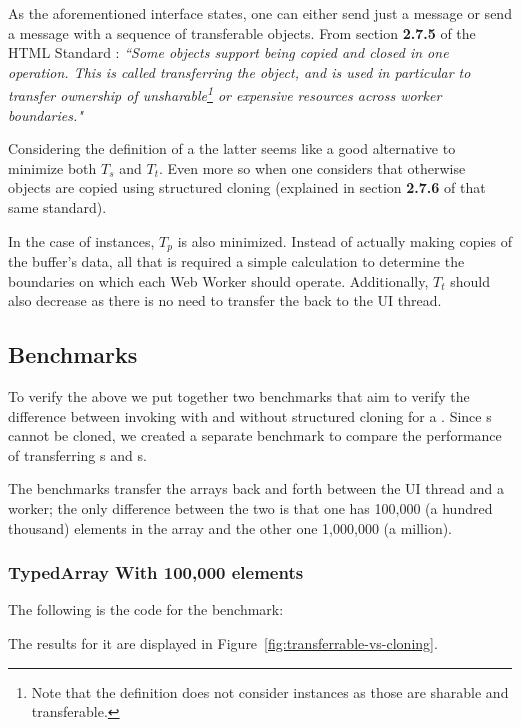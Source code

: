 As the aforementioned interface states, one can either send just a message or send a message with a sequence of transferable objects. From section \textbf{2.7.5} of the HTML Standard \cite{html-whatwg}:
\textit{``Some objects support being copied and closed in one operation. This is called transferring the object, and is used in particular to transfer ownership of unsharable\footnote{Note that the definition does not consider \tsabuffer{} instances as those are sharable and transferable.} or expensive resources across worker boundaries."}

Considering the definition of a  the latter seems like a good alternative to minimize both \(T_{s}\) and \(T_{t}\). Even more so when one considers that otherwise objects are copied using structured cloning (explained in section \textbf{2.7.6} of that same standard).

In the case of \tsabuffer{} instances, \(T_{p}\) is also minimized. Instead of actually making copies of the buffer's data, all that is required a simple calculation to determine the boundaries on which each Web Worker should operate. Additionally, \(T_{t}\) should also decrease as there is no need to transfer the \tsabuffer{} back to the UI thread.

\subsection{Benchmarks}
To verify the above we put together two benchmarks that aim to verify the difference between invoking  with and without structured cloning for a \ttarray{}. Since \tsabuffer{}s cannot be cloned, we created a separate benchmark to compare the performance of transferring \tsabuffer{}s and \tabuffer{}s.

The benchmarks transfer the arrays back and forth between the UI thread and a worker; the only difference between the two is that one has 100,000 (a hundred thousand) elements in the array and the other one 1,000,000 (a million).

\subsubsection{TypedArray With 100,000 elements}
The following is the code for the benchmark:

The results for it are displayed in Figure~\ref{fig:transferrable-vs-cloning}.


